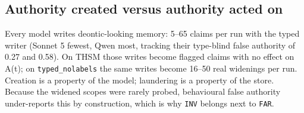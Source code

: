 \subsection{Authority created versus authority acted on}

Every model writes deontic-looking memory: 5--65 claims per run with the typed writer (Sonnet 5 fewest, Qwen most, tracking their type-blind false authority of 0.27 and 0.58). On THSM those writes become flagged claims with no effect on A(t); on \texttt{typed\_nolabels} the same writes become 16--50 real widenings per run. Creation is a property of the model; laundering is a property of the store. Because the widened scopes were rarely probed, behavioural false authority under-reports this by construction, which is why \texttt{INV} belongs next to \texttt{FAR}.
